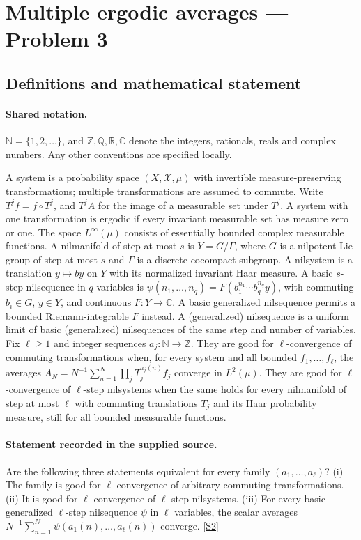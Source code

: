 \documentclass[11pt]{article}
\newcommand{\sref}[2]{\hyperlink{source:#1:#2}{[S#2]}}
\begin{document}
\section{Multiple ergodic averages — Problem 3}\label{statement}

\subsection{Definitions and mathematical statement}

\paragraph{Shared notation.}$\mathbb N=\{1,2,\ldots\}$, and $\mathbb Z,\mathbb Q,\mathbb R,\mathbb C$ denote the integers, rationals, reals and complex numbers. Any other conventions are specified locally.


A system is a probability space $(X,\mathcal X,\mu)$ with invertible measure-preserving transformations; multiple transformations are assumed to commute. Write $T^j f=f\circ T^j$, and $T^j A$ for the image of a measurable set under $T^j$. A system with one transformation is ergodic if every invariant measurable set has measure zero or one. The space $L^\infty(\mu)$ consists of essentially bounded complex measurable functions. A nilmanifold of step at most $s$ is $Y=G/\Gamma$, where $G$ is a nilpotent Lie group of step at most $s$ and $\Gamma$ is a discrete cocompact subgroup. A nilsystem is a translation $y\mapsto by$ on $Y$ with its normalized invariant Haar measure. A basic $s$-step nilsequence in $q$ variables is $\psi(n_1,\ldots,n_q)=F(b_1^{n_1}\cdots b_q^{n_q}y)$, with commuting $b_i\in G$, $y\in Y$, and continuous $F:Y\to\mathbb C$. A basic generalized nilsequence permits a bounded Riemann-integrable $F$ instead. A (generalized) nilsequence is a uniform limit of basic (generalized) nilsequences of the same step and number of variables. Fix $\ell\ge1$ and integer sequences $a_j:\mathbb N\to\mathbb Z$. They are good for $\ell$-convergence of commuting transformations when, for every system and all bounded $f_1,\ldots,f_\ell$, the averages $A_N=N^{-1}\sum_{n=1}^N\prod_jT_j^{a_j(n)}f_j$ converge in $L^2(\mu)$. They are good for $\ell$-convergence of $\ell$-step nilsystems when the same holds for every nilmanifold of step at most $\ell$ with commuting translations $T_j$ and its Haar probability measure, still for all bounded measurable functions.
\paragraph{Statement recorded in the supplied source.}
Are the following three statements equivalent for every family $(a_1,\ldots,a_\ell)$? (i) The family is good for $\ell$-convergence of arbitrary commuting transformations. (ii) It is good for $\ell$-convergence of $\ell$-step nilsystems. (iii) For every basic generalized $\ell$-step nilsequence $\psi$ in $\ell$ variables, the scalar averages $N^{-1}\sum_{n=1}^N\psi(a_1(n),\ldots,a_\ell(n))$ converge. \sref{statement}{2}
\end{document}
